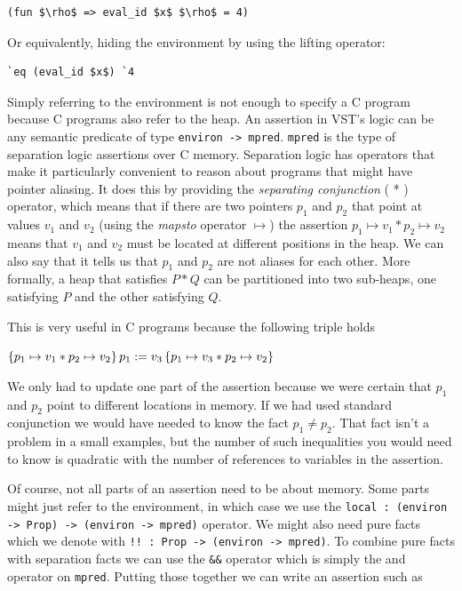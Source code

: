 \documentclass{puthesis}
\begin{document}
\begin{lstlisting}
(fun $\rho$ => eval_id $x$ $\rho$ = 4)
\end{lstlisting}

Or equivalently, hiding the environment by using the lifting operator:

\begin{lstlisting}
`eq (eval_id $x$) `4
\end{lstlisting}

Simply referring to the environment is not enough to specify a C
program because C programs also refer to the heap. An assertion in
VST's logic can be any semantic predicate of type 
\lstinline|environ -> mpred|. 
\lstinline|mpred| is the type of separation logic assertions over C
memory. Separation logic has operators that make it particularly
convenient to reason about programs that might have pointer
aliasing. It does this by providing the \emph{separating conjunction}
( * ) operator, which means that if there are two pointers $p_1$ and
$p_2$ that point at values $v_1$ and $v_2$ (using the \emph{mapsto}
operator $\mapsto$) the assertion $p_1 \mapsto v_1 * p_2 \mapsto v_2$
means that $v_1$ and $v_2$ must be located at different positions in
the heap. We can also say that it tells us that $p_1$ and $p_2$ are
not aliases for each other. More formally, a heap that satisfies
$P * Q$ can be partitioned into two sub-heaps, one satisfying $P$ and
the other satisfying $Q$.

This is very useful in C programs because the following triple holds

$\{p_1 \mapsto v_1 * p_2 \mapsto v_2\}\,p_1 := v_3\,\{p_1 \mapsto v_3 * p_2 \mapsto v_2\}$

We only had to update one part of the assertion because we were
certain that $p_1$ and $p_2$ point to different locations in memory. If
we had used standard conjunction we would have needed to know the fact
$p_1 \neq p_2$. That fact isn't a problem in a small examples, but the
number of such inequalities you would need to know is quadratic with
the number of references to variables in the assertion. 

Of course, not all parts of an assertion need to be about memory. Some
parts might just refer to the environment, in which case we use the
\lstinline|local : (environ -> Prop) -> (environ -> mpred)|
operator. We might also need pure facts which we denote with
\lstinline|!! : Prop -> (environ -> mpred)|. To combine pure facts
with separation facts we can use the \lstinline|&&| operator which is simply the
and operator on \lstinline|mpred|. Putting those together we can write
an assertion such as
\end{document}
